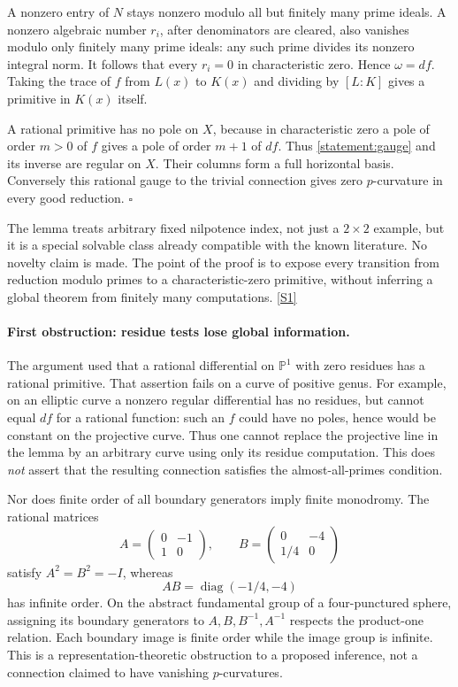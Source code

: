 \documentclass[11pt,a4paper]{article}
\newcommand{\PP}{\mathbb P}
\newcommand{\sref}[2]{\hyperlink{source:#1:#2}{[S#2]}}
\numberwithin{equation}{section}
\begin{document}
A nonzero entry of $N$ stays nonzero modulo all but finitely many prime
ideals. A nonzero algebraic number $r_i$, after denominators are cleared,
also vanishes modulo only finitely many prime ideals: any such prime divides
its nonzero integral norm. It follows that every $r_i=0$ in characteristic
zero. Hence $\omega=df$. Taking the trace of $f$ from $L(x)$ to $K(x)$ and
dividing by $[L:K]$ gives a primitive in $K(x)$ itself.

A rational primitive has no pole on $X$, because in characteristic zero a
pole of order $m>0$ of $f$ gives a pole of order $m+1$ of $df$. Thus
\eqref{statement:gauge} and its inverse are regular on $X$. Their columns form a
full horizontal basis. Conversely this rational gauge to the trivial
connection gives zero $p$-curvature in every good reduction. $\square$

The lemma treats arbitrary fixed nilpotence index, not just a $2\times2$
example, but it is a special solvable class already compatible with the
known literature. No novelty claim is made. The point of the proof is to
expose every transition from reduction modulo primes to a characteristic-zero
primitive, without inferring a global theorem from finitely many computations.
\sref{statement}{1}

\paragraph{First obstruction: residue tests lose global information.}
The argument used that a rational differential on $\PP^1$ with zero residues
has a rational primitive. That assertion fails on a curve of positive genus.
For example, on an elliptic curve a nonzero regular differential has no
residues, but cannot equal $df$ for a rational function: such an $f$ could
have no poles, hence would be constant on the projective curve. Thus one
cannot replace the projective line in the lemma by an arbitrary curve using
only its residue computation. This does \emph{not} assert that the resulting
connection satisfies the almost-all-primes condition.

Nor does finite order of all boundary generators imply finite monodromy.
The rational matrices
\begin{equation}\label{statement:matrices}
 A=\begin{pmatrix}0&-1\\1&0\end{pmatrix},\qquad
 B=\begin{pmatrix}0&-4\\1/4&0\end{pmatrix}
\end{equation}
satisfy $A^2=B^2=-I$, whereas
\[
 AB=\operatorname{diag}(-1/4,-4)
\]
has infinite order. On the abstract fundamental group of a four-punctured
sphere, assigning its boundary generators to $A,B,B^{-1},A^{-1}$ respects
the product-one relation. Each boundary image is finite order while the
image group is infinite. This is a representation-theoretic obstruction to
a proposed inference, not a connection claimed to have vanishing
$p$-curvatures.
\end{document}
